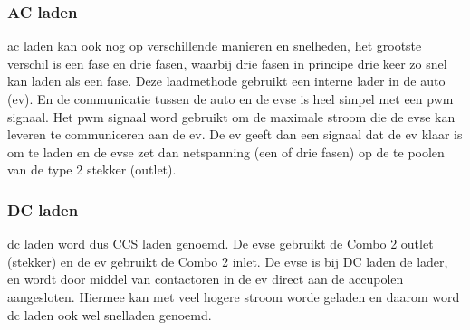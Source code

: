 \subsubsection{AC laden}

\ac{ac} laden kan ook nog op verschillende manieren en snelheden, het grootste
verschil is een fase en drie fasen, waarbij drie fasen in principe drie keer zo
snel kan laden als een fase. Deze laadmethode gebruikt een interne lader in de
auto (\ac{ev}). En de communicatie tussen de auto en de \ac{evse} is heel
simpel met een \ac{pwm} signaal. Het \ac{pwm} signaal word gebruikt om de
maximale stroom die de \ac{evse} kan leveren te communiceren aan de \ac{ev}. De
\ac{ev} geeft dan een signaal dat de \ac{ev} klaar is om te laden en de
\ac{evse} zet dan netspanning (een of drie fasen) op de te poolen van de type 2
stekker (outlet).

\subsubsection{DC laden}

\ac{dc} laden word dus CCS laden genoemd. De \ac{evse} gebruikt de Combo 2
outlet (stekker) en de \ac{ev} gebruikt de Combo 2 inlet. De \ac{evse} is bij
DC laden de lader, en wordt door middel van contactoren in de \ac{ev} direct
aan de accupolen aangesloten. Hiermee kan met veel hogere stroom worde geladen
en daarom word \ac{dc} laden ook wel snelladen genoemd.